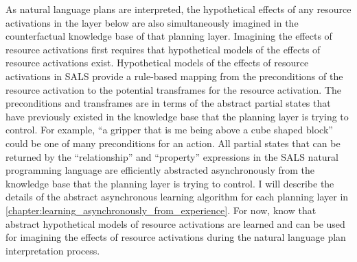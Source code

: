 As natural language plans are interpreted, the hypothetical effects of
any resource activations in the layer below are also simultaneously
imagined in the counterfactual knowledge base of that planning layer.
Imagining the effects of resource activations first requires that
hypothetical models of the effects of resource activations exist.
Hypothetical models of the effects of resource activations in SALS
provide a rule-based mapping from the preconditions of the resource
activation to the potential transframes for the resource activation.
The preconditions and transframes are in terms of the abstract partial
states that have previously existed in the knowledge base that the
planning layer is trying to control.  For example, ``a gripper that is
me being above a cube shaped block'' could be one of many
preconditions for an action.  All partial states that can be returned
by the ``relationship'' and ``property'' expressions in the SALS
natural programming language are efficiently abstracted asynchronously
from the knowledge base that the planning layer is trying to control.
I will describe the details of the abstract asynchronous learning
algorithm for each planning layer in
{\mbox{\autoref{chapter:learning_asynchronously_from_experience}}}.
For now, know that abstract hypothetical models of resource
activations are learned and can be used for imagining the effects of
resource activations during the natural language plan interpretation
process.

